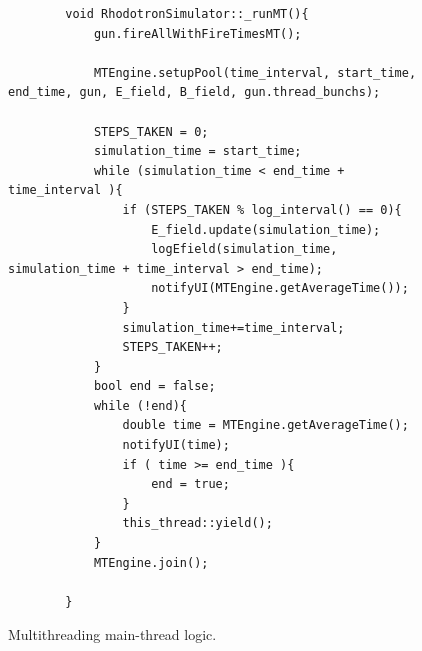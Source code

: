 \documentclass[a4paper,oneside,12pt]{report}
\numberwithin{equation}{chapter}
\begin{document}
\begin{figure}[H]
    \centering
    \begin{verbatim}
        void RhodotronSimulator::_runMT(){
            gun.fireAllWithFireTimesMT();
        
            MTEngine.setupPool(time_interval, start_time, end_time, gun, E_field, B_field, gun.thread_bunchs);
        
            STEPS_TAKEN = 0;
            simulation_time = start_time;
            while (simulation_time < end_time + time_interval ){
                if (STEPS_TAKEN % log_interval() == 0){
                    E_field.update(simulation_time);
                    logEfield(simulation_time, simulation_time + time_interval > end_time);
                    notifyUI(MTEngine.getAverageTime());
                }
                simulation_time+=time_interval;
                STEPS_TAKEN++;
            }
            bool end = false;
            while (!end){
                double time = MTEngine.getAverageTime();
                notifyUI(time);
                if ( time >= end_time ){
                    end = true;
                }
                this_thread::yield();
            }
            MTEngine.join();
            
        }
    \end{verbatim}
    \vspace{20pt}
    \caption{Multithreading main-thread logic.}
    \label{fig:_runMT}
\end{figure}
\vspace{20pt}
\end{document}
